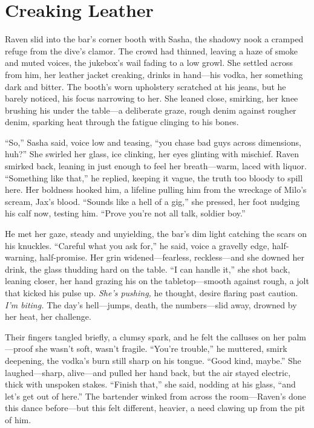 \documentclass[12pt]{book}
\begin{document}
\section{Creaking Leather}

Raven slid into the bar’s corner booth with Sasha, the shadowy nook a cramped refuge from the dive’s clamor. The crowd had thinned, leaving a haze of smoke and muted voices, the jukebox’s wail fading to a low growl. She settled across from him, her leather jacket creaking, drinks in hand—his vodka, her something dark and bitter. The booth’s worn upholstery scratched at his jeans, but he barely noticed, his focus narrowing to her. She leaned close, smirking, her knee brushing his under the table—a deliberate graze, rough denim against rougher denim, sparking heat through the fatigue clinging to his bones.

“So,” Sasha said, voice low and teasing, “you chase bad guys across dimensions, huh?” She swirled her glass, ice clinking, her eyes glinting with mischief. Raven smirked back, leaning in just enough to feel her breath—warm, laced with liquor. “Something like that,” he replied, keeping it vague, the truth too bloody to spill here. Her boldness hooked him, a lifeline pulling him from the wreckage of Milo’s scream, Jax’s blood. “Sounds like a hell of a gig,” she pressed, her foot nudging his calf now, testing him. “Prove you’re not all talk, soldier boy.”

He met her gaze, steady and unyielding, the bar’s dim light catching the scars on his knuckles. “Careful what you ask for,” he said, voice a gravelly edge, half-warning, half-promise. Her grin widened—fearless, reckless—and she downed her drink, the glass thudding hard on the table. “I can handle it,” she shot back, leaning closer, her hand grazing his on the tabletop—smooth against rough, a jolt that kicked his pulse up. \textit{She’s pushing,} he thought, desire flaring past caution. \textit{I’m biting.} The day’s hell—jumps, death, the numbers—slid away, drowned by her heat, her challenge.

Their fingers tangled briefly, a clumsy spark, and he felt the calluses on her palm—proof she wasn’t soft, wasn’t fragile. “You’re trouble,” he muttered, smirk deepening, the vodka’s burn still sharp on his tongue. “Good kind, maybe.” She laughed—sharp, alive—and pulled her hand back, but the air stayed electric, thick with unspoken stakes. “Finish that,” she said, nodding at his glass, “and let’s get out of here.” The bartender winked from across the room—Raven’s done this dance before—but this felt different, heavier, a need clawing up from the pit of him.
\end{document}
